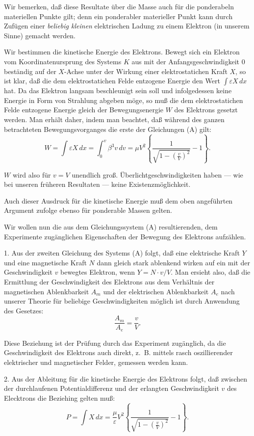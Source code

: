\documentclass[17pt]{webarticle}       %
\begin{document}
Wir bemerken, daß diese Resultate über die Masse auch für die ponderabeln materiellen Punkte gilt; denn ein ponderabler materieller Punkt kann durch Zufügen einer \emph{beliebig kleinen} elektrischen Ladung zu einem Elektron (in unserem Sinne) gemacht werden.

Wir bestimmen die kinetische Energie des Elektrons. Bewegt sich ein Elektron vom Koordinatenursprung des Systems \( K \) aus mit der Anfangsgeschwindigkeit 0 beständig auf der \(X\)-Achse unter der Wirkung einer elektrostatichen Kraft \(X\), so ist klar, daß die dem elektrostatichen Felde entzogene Energie den Wert \(\int \varepsilon X \, dx\) hat. Da das Elektron langsam beschleunigt sein soll und infolgedessen keine Energie in Form von Strahlung abgeben möge, so muß die dem elektrostatichen Felde entzogene Energie gleich der Bewegungsenergie \(W\) des Elektrons gesetzt werden. Man erhält daher, indem man beachtet, daß während des ganzen betrachteten Bewegungsvorganges die erste der Gleichungen (A) gilt:
\[
W = \int \varepsilon X \, dx = \int_0^v \beta^3 v \, dv = \mu V^2 \left\{ \frac{1}{\sqrt{1 - \left( \frac{v}{V} \right)^2}} - 1 \right\}.
\]

\(W\) wird also für \(v = V\) unendlich groß. Überlichtgeschwindigkeiten haben — wie bei unseren früheren Resultaten — keine Existenzmöglichkeit.

Auch dieser Ausdruck für die kinetische Energie muß dem oben angeführten Argument zufolge ebenso für ponderable Massen gelten.

Wir wollen nun die aus dem Gleichungssystem (A) resultierenden, dem Experimente zugänglichen Eigenschaften der Bewegung des Elektrons aufzählen.

1. Aus der zweiten Gleichung des Systems (A) folgt, daß eine elektrische Kraft \(Y\) und eine magnetische Kraft \(N\) dann gleich stark ablenkend wirken auf ein mit der Geschwindigkeit \(v\) bewegtes Elektron, wenn \(Y = N \cdot v / V\). Man ersieht also, daß die Ermittlung der Geschwindigkeit des Elektrons aus dem Verhältnis der magnetischen Ablenkbarkeit \(A_m\) und der elektrischen Ablenkbarkeit \(A_e\) nach unserer Theorie für beliebige Geschwindigkeiten möglich ist durch Anwendung des Gesetzes:
\[
\frac{A_m}{A_e} = \frac{v}{V} .
\]

Diese Beziehung ist der Prüfung durch das Experiment zugänglich, da die Geschwindigkeit des Elektrons auch direkt, z.~B. mittels rasch oszillierender elektrischer und magnetischer Felder, gemessen werden kann.

2. Aus der Ableitung für die kinetische Energie des Elektrons folgt, daß zwischen der durchlaufenen Potentialdifferenz und der erlangten Geschwindigkeit \( v \) des Elecktrons die Beziehing gelten muß:
\[
P = \int X \, dx = \frac{\mu}{\varepsilon} V^2 \left\{ \frac{1}{\sqrt{1 - \left( \frac{v}{V} \right)^2}} - 1 \right\} .
\]
\end{document}
